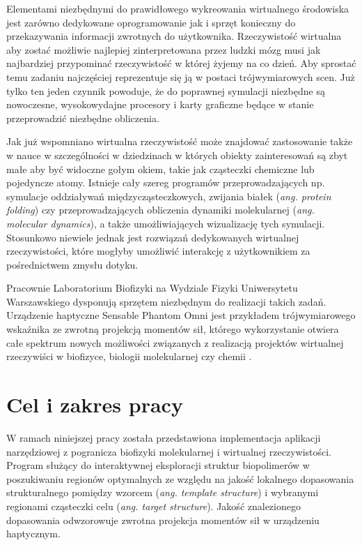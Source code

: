 \documentclass[licencjacka]{pracamgr}
\begin{document}
Elementami niezbędnymi do prawidłowego wykreowania wirtualnego środowiska jest zarówno dedykowane oprogramowanie jak i sprzęt konieczny do przekazywania informacji zwrotnych do użytkownika. Rzeczywistość wirtualna aby zostać możliwie najlepiej zinterpretowana przez ludzki mózg musi jak najbardziej przypominać rzeczywistość w której żyjemy na co dzień. Aby sprostać temu zadaniu najczęściej reprezentuje się ją w postaci trójwymiarowych scen. Już tylko ten jeden czynnik powoduje, że do poprawnej symulacji niezbędne są nowoczesne, wysokowydajne procesory i karty graficzne będące w stanie przeprowadzić niezbędne obliczenia.

Jak już wspomniano wirtualna rzeczywistość może znajdować zastosowanie także w nauce w szczególności w dziedzinach w których obiekty zainteresowań są zbyt małe aby być widoczne gołym okiem, takie jak cząsteczki chemiczne lub pojedyncze atomy. Istnieje cały szereg programów przeprowadzających np. symulacje oddziaływań międzycząsteczkowych, zwijania białek (\textit{ang. protein folding}) czy przeprowadzających obliczenia dynamiki molekularnej (\textit{ang. molecular dynamics}), a także umożliwiających wizualizację tych symulacji. Stosunkowo niewiele jednak jest rozwiązań dedykowanych wirtualnej rzeczywistości, które mogłyby umożliwić interakcję z użytkownikiem za pośrednictwem zmysłu dotyku. 
	
Pracownie Laboratorium Biofizyki na Wydziale Fizyki Uniwersytetu Warszawskiego dysponują sprzętem niezbędnym do realizacji takich zadań. Urządzenie haptyczne Sensable Phantom Omni jest przykładem trójwymiarowego wskaźnika ze zwrotną projekcją momentów sił, którego wykorzystanie otwiera całe spektrum nowych możliwości związanych z realizacją projektów wirtualnej rzeczywiści w biofizyce, biologii molekularnej czy chemii  \cite{vrLecture2011}. 

\chapter*{Cel i zakres pracy}

W ramach niniejszej pracy została przedstawiona implementacja aplikacji narzędziowej z pogranicza biofizyki molekularnej i wirtualnej rzeczywistości. Program służący do interaktywnej eksploracji struktur biopolimerów w poszukiwaniu regionów optymalnych ze względu na jakość lokalnego dopasowania strukturalnego pomiędzy wzorcem (\textit{ang. template structure}) i wybranymi regionami cząsteczki celu (\textit{ang. target structure}). Jakość znalezionego dopasowania odwzorowuje zwrotna projekcja momentów sił w urządzeniu haptycznym. 
	
\end{document}
